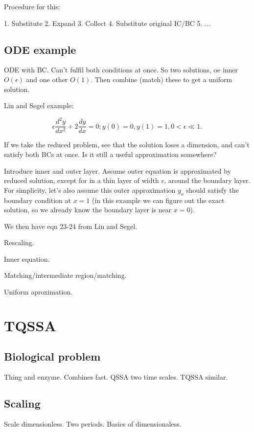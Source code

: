 \documentclass[12pt]{report}
\begin{document}
Procedure for this:

1. Substitute
2. Expand
3. Collect
4. Substitute original IC/BC
5. ...

\section{ODE example}

ODE with BC. Can't fulfil both conditions at once. So two solutions, oe inner
$O(\epsilon)$ and one other $O(1)$. Then combine (match) these to get a uniform
solution.

Lin and Segel example:

$$\epsilon \frac{d^2 y}{d x^2} + 2 \frac{dy}{dx} = 0; y(0)=0, y(1)=1, 0 <
\epsilon \ll 1.$$

If we take the reduced problem, see that the solution loses a dimension, and
can't satisfy both BCs at once. Is it still a useful approximation somewhere?

Introduce inner and outer layer. Assume outer equation is approximated by
reduced solution, except for in a thin layer of width $\epsilon$, around the
boundary layer. For simplicity, let's also assume this outer approximation
$y_o$ should satisfy the boundary condition at $x=1$ (in this example we can
figure out the exact solution, so we already know the boundary layer is near
$x=0$).

We then have eqn 23-24 from Lin and Segel.

Rescaling.

Inner equation.

Matching/intermediate region/matching.

Uniform aproximation.

\chapter{TQSSA}

\section{Biological problem}

Thing and enzyme. Combines fast. QSSA two time scales. TQSSA similar.

\section{Scaling}

Scale dimensionless. Two periods. Basics of dimensionaless.
\end{document}
